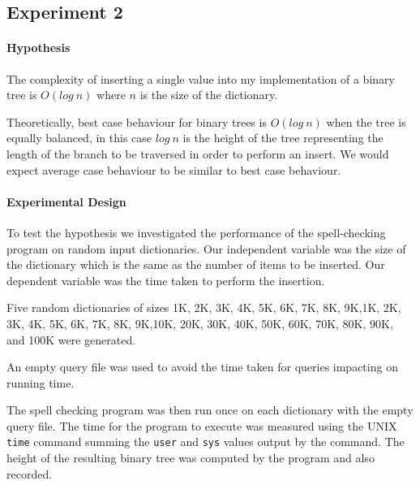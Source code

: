 \subsection{Experiment 2}

\paragraph{Hypothesis}  The complexity of inserting a single value into my implementation of a binary tree is $O(log~n)$ where $n$ is the size of the dictionary. 

Theoretically, best case behaviour for binary trees is $O(log~n)$ when the tree is equally balanced, in this case $log~n$ is the height of the tree representing the length of the branch to be traversed in order to perform an insert.  We would expect average case behaviour to be similar to best case behaviour.  

\paragraph{Experimental Design} 

To test the hypothesis we investigated the performance of the spell-checking program on random input dictionaries.  Our independent variable was the size of the dictionary which is the same as the number of items to be inserted.  Our dependent variable was the time taken to perform the insertion.

Five random dictionaries of sizes \ifjava 1K, 2K, 3K, 4K, 5K, 6K, 7K, 8K, 9K,\fi \ifpython 1K, 2K, 3K, 4K, 5K, 6K, 7K, 8K, 9K,\fi  10K, 20K, 30K, 40K, 50K, 60K, 70K, 80K, 90K, and 100K  were generated.  

An empty query file was used to avoid the time taken for queries impacting on running time. 

The spell checking program was then run once on each dictionary with the empty query file.  The time for the program to execute was measured using the UNIX \texttt{time} command summing the \texttt{user} and \texttt{sys} values output by the command.  \ifjava The height of the resulting binary tree was computed by the program and also recorded. \fi


